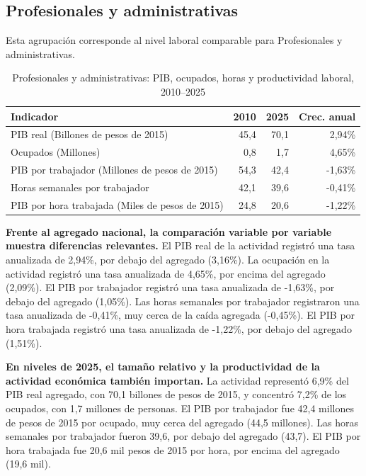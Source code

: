 \subsection{Profesionales y administrativas}

Esta agrupación corresponde al nivel laboral comparable para Profesionales y administrativas.

\begin{table}[H]
\centering
\caption{Profesionales y administrativas: PIB, ocupados, horas y productividad laboral, 2010--2025}
\label{tab:agg25_m_n_productividad}
\small
\begin{tabular}{lrrr}
\toprule
Indicador & 2010 & 2025 & Crec. anual \\
\midrule
PIB real  (Billones de pesos de 2015) & 45,4 & 70,1 & 2,94\% \\
Ocupados (Millones) & 0,8 & 1,7 & 4,65\% \\
PIB por trabajador (Millones de pesos de 2015) & 54,3 & 42,4 & -1,63\% \\
Horas semanales por trabajador & 42,1 & 39,6 & -0,41\% \\
PIB por hora trabajada (Miles de pesos de 2015) & 24,8 & 20,6 & -1,22\% \\
\bottomrule
\end{tabular}
\end{table}

\textbf{Frente al agregado nacional, la comparación variable por variable muestra diferencias relevantes.} El PIB real de la actividad registró una tasa anualizada de 2,94\%, por debajo del agregado (3,16\%). La ocupación en la actividad registró una tasa anualizada de 4,65\%, por encima del agregado (2,09\%). El PIB por trabajador registró una tasa anualizada de -1,63\%, por debajo del agregado (1,05\%). Las horas semanales por trabajador registraron una tasa anualizada de -0,41\%, muy cerca de la caída agregada (-0,45\%). El PIB por hora trabajada registró una tasa anualizada de -1,22\%, por debajo del agregado (1,51\%).

\textbf{En niveles de 2025, el tamaño relativo y la productividad de la actividad económica también importan.} La actividad representó 6,9\% del PIB real agregado, con 70,1 billones de pesos de 2015, y concentró 7,2\% de los ocupados, con 1,7 millones de personas. El PIB por trabajador fue 42,4 millones de pesos de 2015 por ocupado, muy cerca del agregado (44,5 millones). Las horas semanales por trabajador fueron 39,6, por debajo del agregado (43,7). El PIB por hora trabajada fue 20,6 mil pesos de 2015 por hora, por encima del agregado (19,6 mil).

